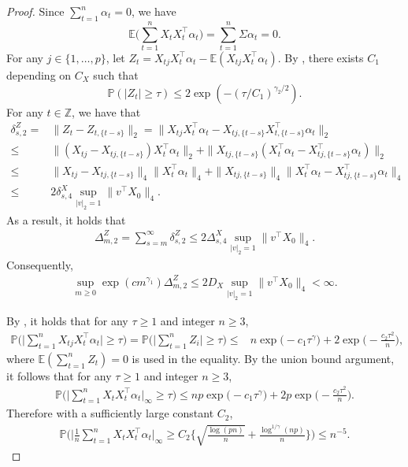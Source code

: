 \documentclass[11pt]{article}
\newcommand{\E}{ { \mathbb{E} } }
\newcommand{\p}{\mathbb P}
\theoremstyle{plain}
\theoremstyle{definition}
\begin{document}
\begin{proof} Since $\sum_{t=1}^n \alpha_t = 0$, we have
$$ \E \bigg( \sum_{t=1}^n X_{t } X^\top _{t}\alpha_t  \bigg) =\sum_{t=1}^n  \Sigma \alpha_t  = 0. $$
 For any $j \in \{1,\ldots,p\} $,
 let $ Z_t  = X_{t j} X_{t}^\top \alpha_t  -\E( X_{t j} X_{t}^\top \alpha_t)  $.    
By ,  there exists $C_1$  depending on $ C_X$   such that
 $$\p ( |Z_t | \ge \tau) \le 2 \exp(- (\tau/C_1)^ {\gamma_2/2}).$$
For any $ t\in \mathbb Z$, we have that
 \begin{align*} 
 \delta_{s, 2}^Z = & \|Z_t - Z_{t,\{ t-s\}} \|_2 =  \|X_{t j} X_{t}^\top \alpha _t - X_{t j,\{ t-s\} }X^\top  _{t,\{ t-s\}}  \alpha_t    \|_2
 \\
 \le & \| ( X_{t j} - X_{t j , \{ t-s\}} ) X_t^\top \alpha_t \|_2 
 +  \|  X_{t j , \{ t-s\}}  (X_{t  } ^\top \alpha_t  - X_{t j, \{ t-s\}}^\top \alpha_t   )    \|_2
 \\
 \le & \|   X_{t j} - X_{t j , \{ t-s\}}  \|_4 \|  X_t^\top \alpha_t \|_4 
 +  \|  X_{t j , \{ t-s\}} \|_4 \|    X_{t  } ^\top \alpha_t  - X_{t j, \{ t-s\}}^\top \alpha_t      \|_4
 \\
 \le & 2\delta  ^X_{s ,4}   \sup_{|v|_2 = 1}\|v^{\top}X_{0}\|_4.
 \end{align*}
 As a result, it holds that
\begin{align*}
    \Delta_{m, 2} ^Z   = \sum_{s = m}^\infty  \delta_{s, 2}^Z \leq 2\Delta  ^X_{s ,4}   \sup_{|v|_2 = 1}\|v^{\top}X_{0}\|_4.
\end{align*}
Consequently, 
 \begin{align*} 
    \sup_{m \geq 0}\exp(cm^{\gamma_1}) \Delta_{m,2} ^Z    \leq     2D_X\sup_{|v|_2 = 1}\|v^{\top}X_{0}\|_4 < \infty.
\end{align*}  

By , it  holds that for any $\tau \ge 1$ and integer $n \geq 3$, 
\begin{align*}
  \p\bigg(   \bigg|  \sum_{t=1}^n  X_{tj } X^\top _{t}\alpha_t   \bigg|  \ge \tau   \bigg) =   \mathbb{P}\Big( \Big|\sum_{t  = 1}^n Z _i    \Big| \geq \tau  \Big) \leq& n\exp\Big(-c_1  \tau ^{\gamma} \Big) + 2 \exp\Big(-\frac{c_2 \tau ^2}{ n   }\Big),
\end{align*}
where  $ \E (\sum_{t  = 1}^nZ_t)=0$ is used in the  equality.   
By the union bound argument, it follows that for any $\tau \ge 1$ and integer $n \geq 3$,
\begin{align*}
  \p\bigg(   \bigg | \sum_{t=1}^n X_{t } X^\top _{t}\alpha_t  \bigg |_\infty  \ge \tau   \bigg)  \leq  n p\exp\Big(-c_1  \tau ^{\gamma} \Big) + 2 p\exp\Big(-\frac{c_2 \tau ^2}{ n   }\Big).
\end{align*}  
Therefore  with a sufficiently large constant $C_2 $,  
\begin{align*}
  \p\bigg(   \bigg | \frac{1}{n}\sum_{t=1}^n  X_{t } X^\top _{t}\alpha_t   \bigg |_\infty  \ge  C_2 \bigg\{  \sqrt { \frac{\log(pn) }{n}  }  +   \frac{ \log^{1/\gamma }(np) }{n} \bigg \}  \bigg)   \leq   n^{-5} .
\end{align*}  
\end{proof} 
 
\end{document}
